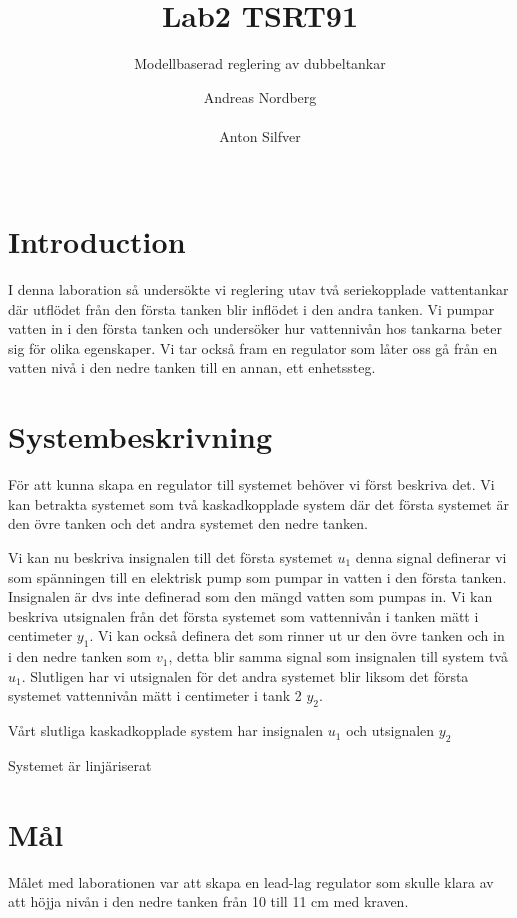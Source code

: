 \documentclass{acm_proc_article-sp}
\title{Lab2 TSRT91}
\subtitle{Modellbaserad reglering av dubbeltankar}
\author{
\alignauthor
Andreas Nordberg\\
\affaddr{Linköping, Sweden}\\
\email{andno793@student.liu.se}
\alignauthor
Anton Silfver\\
\affaddr{Linköping, Sweden}\\
\email{antsi451@student.liu.se} 
}
\begin{document}
\maketitle

\section{Introduction}

I denna laboration så undersökte vi reglering utav två seriekopplade vattentankar där utflödet från den första tanken blir inflödet i den andra tanken. Vi pumpar vatten in i den första tanken och undersöker hur vattennivån hos tankarna beter sig för olika egenskaper. Vi tar också fram en regulator som låter oss gå från en vatten nivå i den nedre tanken till en annan, ett enhetssteg.

\section{Systembeskrivning}

För att kunna skapa en regulator till systemet behöver vi först beskriva det. Vi kan betrakta systemet som två kaskadkopplade system där det första systemet är den övre tanken och det andra systemet den nedre tanken.

Vi kan nu beskriva insignalen till det första systemet $u_1$ denna signal definerar vi som spänningen till en elektrisk pump som pumpar in vatten i den första tanken. Insignalen är dvs inte definerad som den mängd vatten som pumpas in. Vi kan beskriva utsignalen från det första systemet som vattennivån i tanken mätt i centimeter $y_1$. Vi kan också definera det som rinner ut ur den övre tanken och in i den nedre tanken som $v_1$, detta blir samma signal som insignalen till system två $u_1$. Slutligen har vi utsignalen för det andra systemet blir liksom det första systemet vattennivån mätt i centimeter i tank 2 $y_2$.

Vårt slutliga kaskadkopplade system har insignalen $u_1$ och utsignalen $y_2$

Systemet är linjäriserat

\section{Mål}

Målet med laborationen var att skapa en lead-lag regulator som skulle klara av att höjja nivån i den nedre tanken från 10 till 11 cm med kraven.
\end{document}
